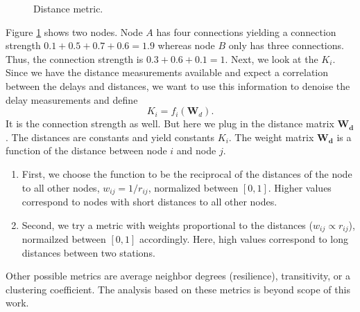 \documentclass[12pt,a4paper,english]{article}
\begin{document}
\begin{figure}[htb]
\centering
{}
\caption{Distance metric.} \label{fig:1}
\end{figure}
Figure \ref{fig:1} shows two nodes. Node $A$ has four connections yielding a connection strength $0.1+0.5+0.7+0.6=1.9$ whereas node $B$ only has three connections. Thus, the connection strength is $0.3+0.6+0.1=1$. Next, we look at the $K_i$. Since we have the distance measurements available and expect a correlation between the delays and distances, we want to use this information to denoise the delay measurements and define
\begin{equation}
K_i=f_i(\bm W_d).
\end{equation}
It is the connection strength as well. But here we plug in the distance matrix $\bm{W_d}$. The distances are constants and yield constants $K_i$.
The weight matrix $\bm{W_d}$ is a function of the distance between node $i$ and node $j$.
\begin{enumerate}
\item First, we choose the function to be the reciprocal of the distances of the node to all other nodes, $w_{ij}= 1/r_{ij}$, normalized between $[0,1]$. Higher values correspond to nodes with short distances to all other nodes.
\item Second, we try a metric with weights proportional to the distances ($w_{ij} \propto r_{ij}$), normailzed between $[0,1]$ accordingly. Here, high values correspond to long distances between two stations.
\end{enumerate}
Other possible metrics are average neighbor degrees (resilience), transitivity, or a clustering coefficient. The analysis based on these metrics is beyond scope of this work.  
\end{document}
